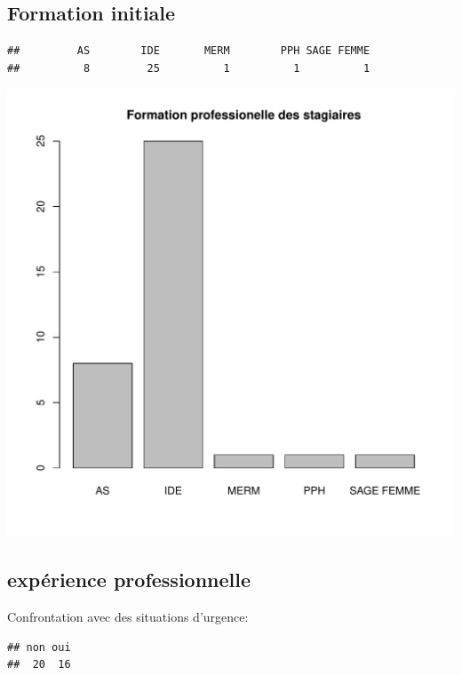 \documentclass[12pt,english,french]{article}\usepackage{graphicx, color}
\makeatletter
\def\maxwidth{ %
  \ifdim\Gin@nat@width>\linewidth
    \linewidth
  \else
    \Gin@nat@width
  \fi
}
\newenvironment{kframe}{%
 \def\at@end@of@kframe{}%
 \ifinner\ifhmode%
  \def\at@end@of@kframe{\end{minipage}}%
  \begin{minipage}{\columnwidth}%
 \fi\fi%
 \def\FrameCommand##1{\hskip\@totalleftmargin \hskip-\fboxsep
 \colorbox{shadecolor}{##1}\hskip-\fboxsep
     \hskip-\linewidth \hskip-\@totalleftmargin \hskip\columnwidth}%
 \MakeFramed {\advance\hsize-\width
   \@totalleftmargin\z@ \linewidth\hsize
   \@setminipage}}%
 {\par\unskip\endMakeFramed%
 \at@end@of@kframe}
\newenvironment{knitrout}{}{} %
\makeatother
\begin{document}
\subsection{Formation initiale}

\begin{knitrout}
\color{fgcolor}\begin{kframe}
\begin{verbatim}
##         AS        IDE       MERM        PPH SAGE FEMME 
##          8         25          1          1          1
\end{verbatim}
\end{kframe}
\includegraphics[width=\maxwidth]{figure/formation} 

\end{knitrout}


\subsection{expérience professionnelle}

Confrontation avec des situations d'urgence:
\begin{knitrout}
\color{fgcolor}\begin{kframe}
\begin{verbatim}
## non oui 
##  20  16
\end{verbatim}
\end{kframe}
\end{knitrout}
\end{document}
